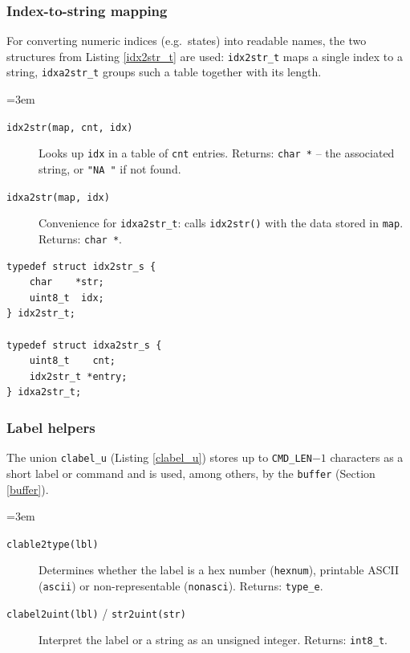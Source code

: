 \subsubsection*{Index-to-string mapping}
For converting numeric indices (e.g.\ states) into readable names, the two
structures from Listing \ref{idx2str_t} are used: \verb|idx2str_t| maps a
single index to a string, \verb|idxa2str_t| groups such a table together with
its length.
{\sloppy\emergencystretch=3em
\begin{description}
\item[\texttt{idx2str(map, cnt, idx)}] Looks up \verb|idx| in a table of
  \verb|cnt| entries. Returns: \verb|char *| -- the associated string, or
  \verb|"NA "| if not found.
\item[\texttt{idxa2str(map, idx)}] Convenience for \verb|idxa2str_t|: calls
  \verb|idx2str()| with the data stored in \verb|map|. Returns: \verb|char *|.
\end{description}
\par}

\begin{listing}
\begin{verbatim}
typedef struct idx2str_s {
    char    *str;
    uint8_t  idx;
} idx2str_t;

typedef struct idxa2str_s {
    uint8_t    cnt;
    idx2str_t *entry;
} idxa2str_t;
\end{verbatim}
\caption{Lookup tables \texttt{idx2str\_t} / \texttt{idxa2str\_t}}
\label{idx2str_t}
\end{listing}

\subsubsection*{Label helpers}
The union \verb|clabel_u| (Listing \ref{clabel_u}) stores up to
\verb|CMD_LEN|$-1$ characters as a short label or command and is used, among
others, by the \verb|buffer| (Section \ref{buffer}).
{\sloppy\emergencystretch=3em
\begin{description}
\item[\texttt{clable2type(lbl)}] Determines whether the label is a hex number
  (\verb|hexnum|), printable ASCII (\verb|ascii|) or non-representable
  (\verb|nonasci|). Returns: \verb|type_e|.
\item[\texttt{clabel2uint(lbl)} / \texttt{str2uint(str)}] Interpret the label
  or a string as an unsigned integer. Returns: \verb|int8_t|.
\end{description}
\par}

